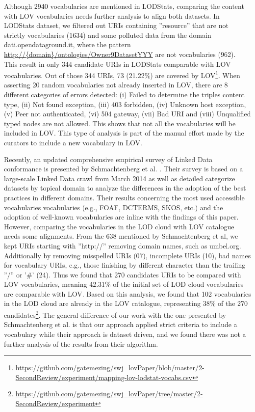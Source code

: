 \documentclass{iosart2c}
\begin{document}
Although 2940 vocabularies are mentioned in LODStats, comparing the content with LOV vocabularies needs further analysis to align both datasets. In LODStats dataset, we filtered out URIs containing ''resource'' that are not strictly vocabularies (1634) and some polluted data from the domain dati.opendataground.it, where the pattern \url{http://{domain}/ontologies/Owner9DatasetYYY} are not vocabularies (962). This result in only 344 candidate URIs in LODStats comparable with LOV vocabularies. Out of those 344 URIs, 73 (21.22\%) are covered by LOV\footnote{\url{https://github.com/gatemezing/swj_lovPaper/blob/master/2-SecondReview/experiment/mapping-lov-lodstat-vocabs.csv}}. When asserting 20 random vocabularies not already inserted in LOV, there are 8 different categories of errors detected: (i) Failed to determine the triples content type, (ii) Not found exception, (iii) 403 forbidden, (iv) Unknown host exception, (v) Peer not authenticated, (vi) 504 gateway, (vii) Bad URI and (viii) Unqualified typed nodes are not allowed. This shows that not all the vocabularies will be included in LOV. This type of analysis is part of the manual effort made by the curators to include a new vocabulary in LOV.

Recently, an updated comprehensive empirical survey of Linked Data conformance is presented by Schmachtenberg et al. \cite{max2014}. Their survey is based on a large-scale Linked Data crawl from March 2014 as well as detailed categorize datasets by topical domain to analyze the differences in the adoption of the best practices in different domains. Their results concerning the most used accessible vocabularies vocabularies (e.g., FOAF, DCTERMS, SKOS, etc.) and the adoption of well-known vocabularies are inline with the findings of this paper. However, comparing the vocabularies in the LOD cloud with LOV catalogue needs some alignments. From the 638 mentioned by Schmachtenberg et al, we kept URIs starting with ''http://'' removing domain names, such as umbel.org. Additionally by removing misspelled URIs (07), incomplete URIs (10), bad names for vocabulary URIs, e.g., those finishing by different character than the trailing ''/'' or '\#' (24). Thus we found that 270 candidates URIs to be compared with LOV vocabularies, meaning 42.31\% of the initial set of LOD cloud vocabularies are comparable with LOV. Based on this analysis, we found that 102 vocabularies in the LOD cloud are already in the LOV catalogue, representing 38\% of the 270 candidates\footnote{\url{https://github.com/gatemezing/swj_lovPaper/tree/master/2-SecondReview/experiment}}. The general difference of our work with the one presented by Schmachtenberg et al. is that our approach applied strict criteria to include a vocabulary while their approach is dataset driven, and we found there was not a further analysis of the results from their algorithm.
\end{document}
